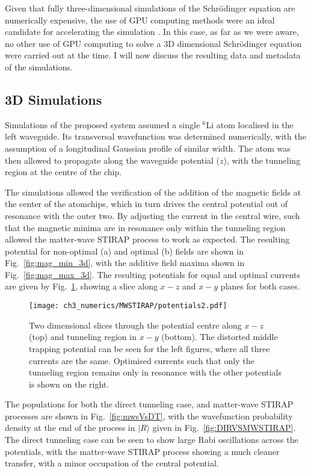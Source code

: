 Given that fully three-dimensional simulations of the Schr\"odinger equation are numerically expensive, the use of GPU computing methods were an ideal candidate for accelerating the simulation \cite{Bauke:11}. In this case, as far as we were aware, no other use of GPU computing to solve a 3D dimensional Schr\"odinger equation were carried out at the time. I will now discuss the resulting data and metadata of the simulations.


\subsection{3D Simulations}
\label{sec:Results}

Simulations of the proposed system assumed a single $^{6}$Li atom localised in the left waveguide. Its transversal wavefunction was determined numerically, with the assumption of a longitudinal Gaussian profile of similar width. The atom was then allowed to propagate along the waveguide potential ($z$), with the tunneling region at the centre of the chip.

The simulations allowed the verification of the addition of the magnetic fields at the center of the atomchips, which in turn drives the central potential out of resonance with the outer two. By adjusting the current in the central wire, such that the magnetic minima are in resonance only within the tunneling region allowed the matter-wave STIRAP process to work as expected. The resulting potential for non-optimal (a) and optimal (b) fields are shown in Fig.~\ref{fig:mag_min_3d}, with the additive field maxima shown in Fig.~\ref{fig:mag_max_3d}. The resulting potentials for equal and optimal currents are given by Fig.~\ref{fig:equaloptcurrent}, showing a slice along $x-z$ and $x-y$ planes for both cases.

\begin{figure}[tb]
    \centering
  \texttt{[image: ch3\_numerics/MWSTIRAP/potentials2.pdf]}
  \caption{Two dimensional slices through the potential centre along $x-z$ (top) and tunneling region in $x-y$ (bottom). The distorted middle trapping potential can be seen for the left figures, where all three currents are the same. Optimised currents such that only the tunneling region remains only in resonance with the other potentials is shown on the right.}
  \label{fig:equaloptcurrent}
\end{figure}

The populations for both the direct tunneling case, and matter-wave STIRAP processes are shown in Fig.~\ref{fig:mwsVsDT}, with the wavefunction probability density at the end of the process in $|R\rangle$ given in Fig.~\ref{fig:DIRVSMWSTIRAP}. The direct tunneling case can be seen to show large Rabi oscillations across the potentials, with the matter-wave STIRAP process showing a much cleaner transfer, with a minor occupation of the central potential.

